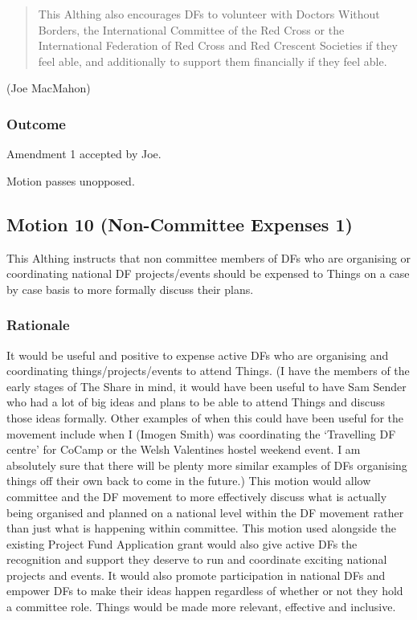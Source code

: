 \documentclass[a4paper, 11pt]{article} %
\begin{document}
\begin{quote}
This Althing also encourages DFs to volunteer with Doctors Without Borders, the International Committee of the Red Cross or the International Federation of Red Cross and Red Crescent Societies if they feel able, and additionally to support them financially if they feel able.
\end{quote}

(Joe MacMahon)

\subsubsection{Outcome}

Amendment 1 accepted by Joe.

Motion passes unopposed.

\subsection{Motion 10 (Non-Committee Expenses 1)}

This Althing instructs that non committee members of DFs who are organising or coordinating national DF projects/events should be expensed to Things on a case by case basis to more formally discuss their plans. 

\subsubsection{Rationale}

It would be useful and positive to expense active DFs who are organising and coordinating things/projects/events to attend Things. (I have the members of the early stages of The Share in mind, it would have been useful to have Sam Sender who had a lot of big ideas and plans to be able to attend Things and discuss those ideas formally.  Other examples of when this could have been useful for the movement include when I (Imogen Smith) was coordinating the `Travelling DF centre' for CoCamp or the Welsh Valentines hostel weekend event.  I am absolutely sure that there will be plenty more similar examples of DFs organising things off their own back to come in the future.)  This motion would allow committee and the DF movement to more effectively discuss what is actually being organised and planned on a national level within the DF movement rather than just what is happening within committee.  This motion used alongside the existing Project Fund Application grant would also give active DFs the recognition and support they deserve to run and coordinate exciting national projects and events.  It would also promote participation in national DFs and empower DFs to make their ideas happen regardless of whether or not they hold a committee role.  Things would be made more relevant, effective and inclusive.
\end{document}
